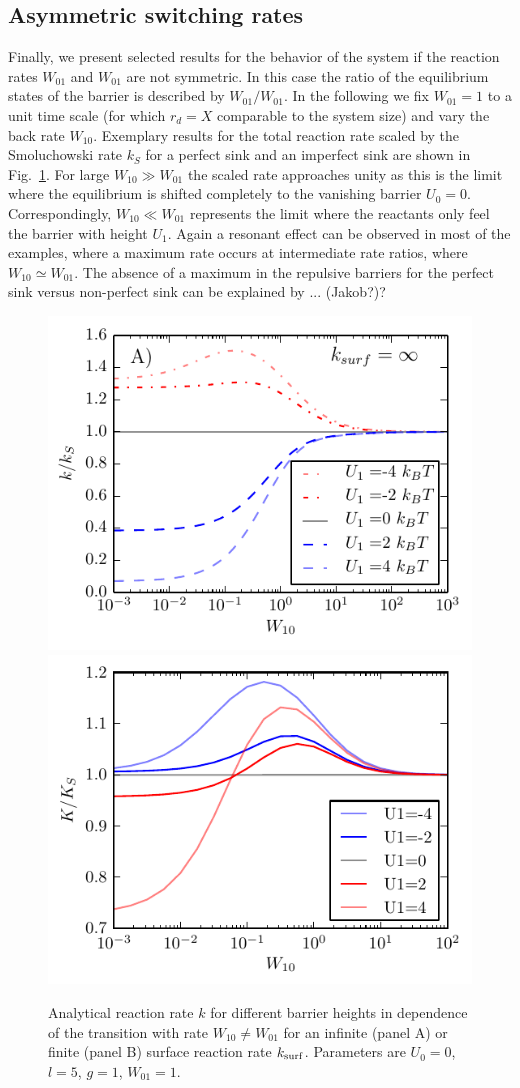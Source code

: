 \documentclass[preprint,superscriptaddress]{revtex4-1}
\begin{document}
\subsection{Asymmetric switching rates}

Finally, we present selected results for the behavior of the system if the reaction rates $W_{01}$ and $W_{01}$ are not symmetric. 
In this case the ratio of the equilibrium states of the barrier  is described by $W_{01}/W_{01}$.
In the following we fix $W_{01}=1$ to a unit time scale (for which $r_d = X$ comparable to the system size) and vary the back rate $W_{10}$. Exemplary results
for the total reaction rate scaled by the Smoluchowski rate $k_S$ for a perfect sink and an imperfect sink are shown in Fig.~\ref{fig:asymm}. 
For large $W_{10} \gg W_{01}$ the scaled rate approaches unity as this is the limit where the equilibrium is shifted completely
to the vanishing barrier $U_0=0$. Correspondingly, $W_{10} \ll W_{01}$ represents the limit where the reactants 
only feel the barrier with height $U_1$. Again a resonant effect can be observed in most of the examples, where a maximum rate
occurs at intermediate rate ratios, where $W_{10} \simeq W_{01}$.  The absence of a maximum in the repulsive barriers for the
perfect sink versus non-perfect sink can be explained by ... (Jakob?)? 

\begin{figure}[H]
\begin{center}
    \includegraphics[width= 0.45 \textwidth]{plots/perfect_sink_transition.pdf}
    \includegraphics[width= 0.45 \textwidth]{plots/non_perfect_sink_transition.pdf}
    \caption{Analytical reaction rate $k$ for different barrier heights in dependence of the transition with rate $W_{10}\neq W_{01}$ for an infinite (panel A) 
    or finite (panel B) surface reaction rate $k_{\rm surf}$. Parameters are $U_0 = 0$, $l=5$, $g=1$, $W_{01}=1$.}
    \label{fig:asymm}
    \end{center}
\end{figure}
\end{document}
